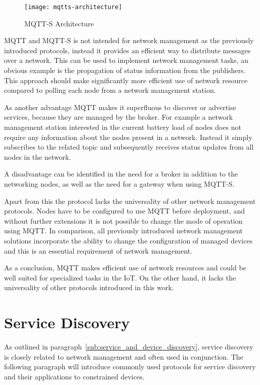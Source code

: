 \documentclass[conference]{IEEEtran}
\begin{document}
\begin{figure}[h]
  \begin{center}
    \texttt{[image: mqtts-architecture]}
  \end{center}
  \caption{MQTT-S Architecture~\cite{Hunkeler2008}}
  \label{fig:mqtts-architecture}
\end{figure}

MQTT and MQTT-S is not intended for network management as the previously introduced protocols, instead it provides an efficient way to distribute messages over a network. This can be used to implement network management tasks, an obvious example is the propagation of status information from the publishers. This approach should make significantly more efficient use of network resource compared to polling each node from a network management station.

As another advantage MQTT makes it superfluous to discover or advertise services, because they are managed by the broker. For example a network management station interested in the current battery load of nodes does not require any information about the nodes present in a network. Instead it simply subscribes to the related topic and subsequently receives status updates from all nodes in the network.

A disadvantage can be identified in the need for a broker in addition to the networking nodes, as well as the need for a gateway when using MQTT-S.

Apart from this the protocol lacks the universality of other network management protocols. Nodes have to be configured to use MQTT before deployment, and without further extensions it is not possible to change the mode of operation using MQTT. In comparison, all previously introduced network management solutions incorporate the ability to change the configuration of managed devices and this is an essential requirement of network management.

As a conclusion, MQTT makes efficient use of network resources and could be well suited for specialized tasks in the IoT. On the other hand, it lacks the universality of other protocols introduced in this work.



\section{Service Discovery} %
\label{sec:service_discovery}
As outlined in paragraph~\ref{sub:service_and_device_discovery}, service discovery is closely related to network management and often used in conjunction. The following paragraph will introduce commonly used protocols for service discovery and their applications to constrained devices.
\end{document}
